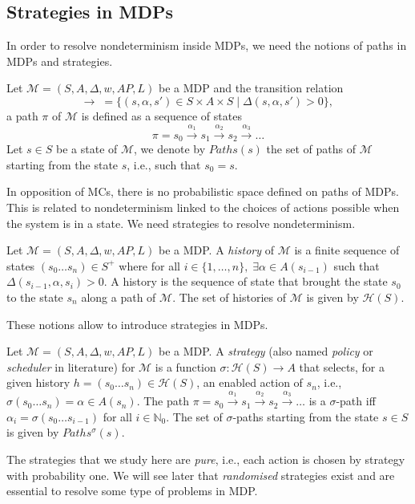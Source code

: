 \subsection{Strategies in MDPs}
In order to resolve nondeterminism inside MDPs, we need the notions of paths in MDPs and strategies.
\begin{definition}
  Let $\mathcal{M}=(S, A, \Delta, w, AP, L)$ be a MDP and the transition relation
  \[\rightarrow \; =  \{ (s, \alpha, s') \in S \times A \times S \; | \; \Delta(s, \alpha, s') > 0 \}, \,\]
	a path $\pi$ of $\mathcal{M}$ is defined as a sequence of states
	\[ \pi = s_0 \xrightarrow{\alpha_1} s_1 \xrightarrow{\alpha_2} s_2 \xrightarrow{\alpha_3} \dots \]
	Let $s \in S$ be a state of $\mathcal{M}$, we denote by $Paths(s)$ the set of
	paths of $\mathcal{M}$ starting from the state $s$, i.e., such that $s_0 = s$.
\end{definition}
In opposition of MCs, there is no probabilistic space defined on paths of MDPs.
This is related to nondeterminism linked to the choices of actions possible when the system is in a state. We need strategies to resolve nondeterminism.
\begin{definition}
	Let $\mathcal{M} = (S, A, \Delta, w, AP, L)$ be a MDP. A \textit{history} of $\mathcal{M}$
	is a finite sequence of states $(s_0 \dots s_n) \in S^+$ where for all
	$i \in \{1, \dots, n \}, \; \exists \alpha \in A(s_{i-1})$ such that $\Delta(s_{i-1}, \alpha, s_i) > 0$.
	A history is the sequence of state that brought the state $s_0$ to the state $s_n$ along a path of $\mathcal{M}$. The set of histories of $\mathcal{M}$  is given by $\mathcal{H}(S)$.
\end{definition}

These notions allow to introduce strategies in MDPs.

\begin{definition}
Let $\mathcal{M} = (S, A, \Delta, w, AP, L)$ be a MDP. A \textit{strategy} (also named \textit{policy} or \textit{scheduler} in literature) for $\mathcal{M}$
	is a function
	$\sigma : \mathcal{H}(S) \rightarrow A$
	that selects, for a given history $h = (s_0 \dots s_n) \in \mathcal{H}(S)$, an enabled action of $s_n$, i.e., $\sigma(s_0 \dots s_n) = \alpha \in A(s_n)$.
	The path $\pi = s_0 \xrightarrow{\alpha_1} s_1 \xrightarrow{\alpha_2} s_2 \xrightarrow{\alpha_3} \dots$
	is a $\sigma$-path iff $\alpha_i = \sigma(s_0 \dots s_{i-1})$
	for all $i \in \mathbb{N}_0$. The set of $\sigma$-paths starting from the state $s \in S$ is given by $Paths^\sigma(s)$.
\end{definition}
The strategies that we study here are \textit{pure}, i.e., each action is chosen by strategy with probability one. We will see later that \textit{randomised} strategies exist and are essential to resolve some type of problems in MDP. \\

